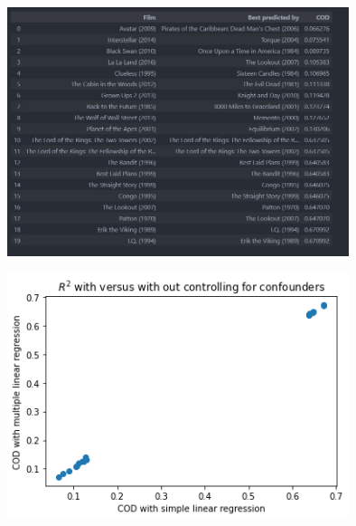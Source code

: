 \documentclass{article}
\begin{document}
\begin{figure}[t]
  \centering

  \includegraphics[width=10cm]{data anlysis project 2/apendix_figure_1.jpg}
 \caption{}
 \label{apendix fig:2}
\end{figure}

\begin{figure}[t]
  \centering

  \includegraphics[width=10cm]{data anlysis project 2/figure_2.png}
 \caption{}
 \label{fig:1}
\end{figure}
\end{document}
